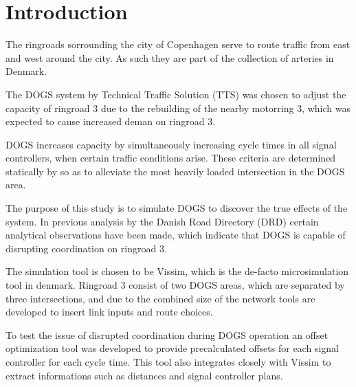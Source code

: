 \section{Introduction}

The ringroads sorrounding the city of Copenhagen serve to route traffic from east and west around the city. As such they are part of the collection of arteries in Denmark.

The DOGS system by Technical Traffic Solution (TTS) was chosen to adjust the capacity of ringroad 3 due to the rebuilding of the nearby motorring 3, which was expected to cause increased deman on ringroad 3.

DOGS increases capacity by simultaneously increasing cycle times in all signal controllers, when certain traffic conditions arise. These criteria are determined statically by so as to alleviate the most heavily loaded intersection in the DOGS area.

The purpose of this study is to simulate DOGS to discover the true effects of the system. In previous analysis by the Danish Road Directory (DRD) certain analytical observations have been made, which indicate that DOGS is capable of disrupting coordination on ringroad 3.

The simulation tool is chosen to be Vissim, which is the de-facto microsimulation tool in denmark. Ringroad 3 consist of two DOGS areas, which are separated by three intersections, and due to the combined size of the network tools are developed to insert link inputs and route choices.

To test the issue of disrupted coordination during DOGS operation an offset optimization tool was developed to provide precalculated offsets for each signal controller for each cycle time. This tool also integrates closely with Vissim to extract informations such as distances and signal controller plans. 

